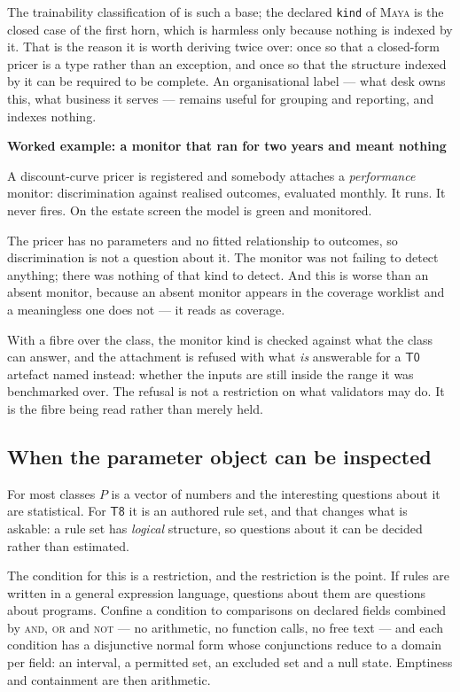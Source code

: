 \documentclass[11pt,a4paper]{article}
\renewcommand{\_}{\oldunderscore\allowbreak}
\theoremstyle{plain}
\theoremstyle{definition}
\theoremstyle{definition}
\theoremstyle{remark}
\newcommand{\wk}[1]{\textbf{Worked example: #1}\par\smallskip}
\begin{document}
The trainability classification of  is such a base; the declared
\texttt{kind} of \textsc{Maya} is the closed case of the first horn, which is harmless only because
nothing is indexed by it. That is the reason it is
worth deriving twice over: once so that a closed-form pricer is a type rather than an exception, and once
so that the structure indexed by it can be required to be complete. An organisational label --- what desk
owns this, what business it serves --- remains useful for grouping and reporting, and indexes nothing.

\begin{worked}
\wk{a monitor that ran for two years and meant nothing}
A discount-curve pricer is registered and somebody attaches a \emph{performance} monitor: discrimination
against realised outcomes, evaluated monthly. It runs. It never fires. On the estate screen the model is
green and monitored.

The pricer has no parameters and no fitted relationship to outcomes, so discrimination is not a question
about it. The monitor was not failing to detect anything; there was nothing of that kind to detect. And
this is worse than an absent monitor, because an absent monitor appears in the coverage worklist and a
meaningless one does not --- it reads as coverage.

With a fibre over the class, the monitor kind is checked against what the class can answer, and the
attachment is refused with what \emph{is} answerable for a $\textsf{T0}$ artefact named instead: whether
the inputs are still inside the range it was benchmarked over. The refusal is not a restriction on what
validators may do. It is the fibre being read rather than merely held.
\end{worked}

\subsection{When the parameter object can be inspected}\label{sec:rulesets}

For most classes $P$ is a vector of numbers and the interesting questions about it are statistical. For
$\textsf{T8}$ it is an authored rule set, and that changes what is askable: a rule set has \emph{logical}
structure, so questions about it can be decided rather than estimated.

The condition for this is a restriction, and the restriction is the point. If rules are written in a
general expression language, questions about them are questions about programs. Confine a condition to
comparisons on declared fields combined by \textsc{and}, \textsc{or} and \textsc{not} --- no arithmetic,
no function calls, no free text --- and each condition has a disjunctive normal form whose conjunctions
reduce to a domain per field: an interval, a permitted set, an excluded set and a null state. Emptiness
and containment are then arithmetic.
\end{document}
